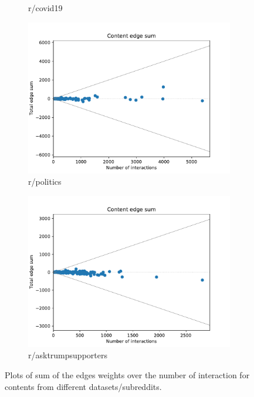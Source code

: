 \begin{figure}
\begin{center}
\begin{subfigure}[b]{0.4\textwidth}
			\caption{r/covid19}
			\label{fig:tex/out/covid19200/edge-sum-n-interactions.pdf}
		\end{subfigure}
		\begin{subfigure}[b]{0.4\textwidth}
			\centering
			\includegraphics[width=\textwidth]{tex/out/politics200/edge-sum-n-interactions.pdf}
			\caption{r/politics}
			\label{fig:tex/out/cats200/edge-sum-n-interactions.pdf}
		\end{subfigure}
		\begin{subfigure}[b]{0.4\textwidth}
			\centering
			\includegraphics[width=\textwidth]{tex/out/asktrumpsupporters200/edge-sum-n-interactions.pdf}
			\caption{r/asktrumpsupporters}
			\label{fig:tex/out/covid19200/edge-sum-n-interactions.pdf}
		\end{subfigure}
	\end{center}
	\caption[Sum edges over number of interactions for many datasets]{Plots of
		sum of the edges weights over the number of interaction for contents
		from different datasets/subreddits.}
	\label{fig:edge-sum-n-interactions}
\end{figure}

